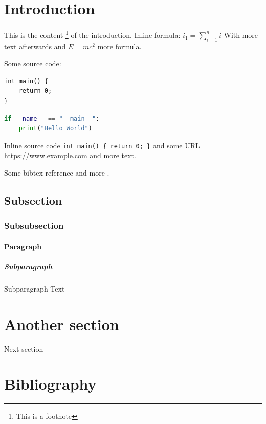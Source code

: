 \documentclass{article}
\begin{document}
\section{Introduction}

This is the content \footnote{This is a footnote} of the introduction.
Inline formula: $i_1=\sum_{i=1}^n i$ With more text afterwards and $E = mc^2$ more formula.

Some source code:
\begin{verbatim}
int main() {
    return 0;
}
\end{verbatim}

\begin{lstlisting}[frame=single, language=python, caption=Python example]
if __name__ == "__main__":
    print("Hello World")
\end{lstlisting}

Inline source code \verb|int main() { return 0; }| and some URL \url{https://www.example.com} and more text.

Some bibtex reference \cite{ref1} and more \cite{ref2}.


\subsection{Subsection}

\subsubsection{Subsubsection}

\paragraph{Paragraph}

\subparagraph{Subparagraph}

Subparagraph Text

\section{Another section}

Next section

\section{Bibliography}



\end{document}
